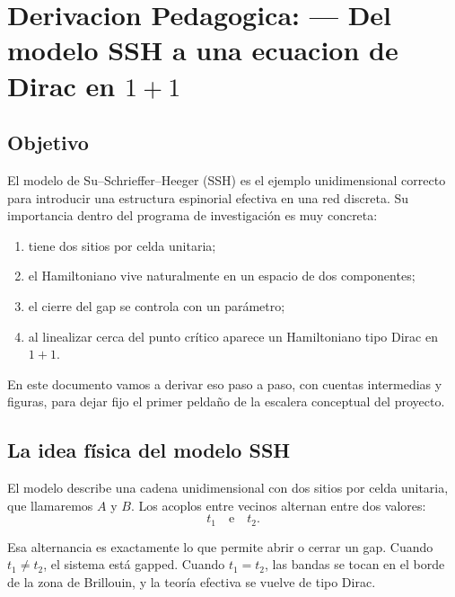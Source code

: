 \chapter{Derivacion Pedagogica: --- Del modelo SSH a una ecuacion de Dirac en \(1+1\)}
\label{ch:ssh-a-dirac-1d}







\section{Objetivo}

El modelo de Su--Schrieffer--Heeger (SSH) es el ejemplo unidimensional correcto para introducir una estructura espinorial efectiva en una red discreta. Su importancia dentro del programa de investigación es muy concreta:

\begin{enumerate}[leftmargin=*]
  \item tiene dos sitios por celda unitaria;
  \item el Hamiltoniano vive naturalmente en un espacio de dos componentes;
  \item el cierre del gap se controla con un parámetro;
  \item al linealizar cerca del punto crítico aparece un Hamiltoniano tipo Dirac en \(1+1\).
\end{enumerate}

En este documento vamos a derivar eso paso a paso, con cuentas intermedias y figuras, para dejar fijo el primer peldaño de la escalera conceptual del proyecto.

\section{La idea física del modelo SSH}

El modelo describe una cadena unidimensional con dos sitios por celda unitaria, que llamaremos \(A\) y \(B\). Los acoplos entre vecinos alternan entre dos valores:
\begin{equation}
t_1 \quad \text{e} \quad t_2.
\end{equation}

Esa alternancia es exactamente lo que permite abrir o cerrar un gap. Cuando \(t_1\neq t_2\), el sistema está gapped. Cuando \(t_1=t_2\), las bandas se tocan en el borde de la zona de Brillouin, y la teoría efectiva se vuelve de tipo Dirac.

